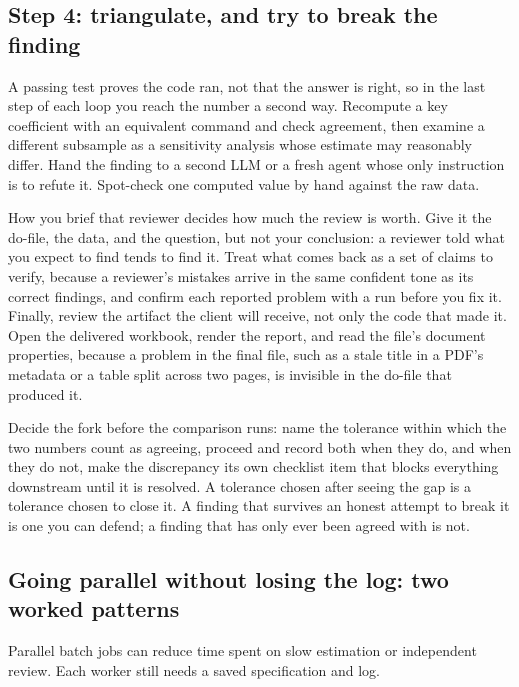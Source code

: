 \subsection{Step 4: triangulate, and try to break the finding}
A passing test proves the code ran, not that the answer is right, so in the last step of each loop you reach the number a second way. Recompute a key coefficient with an equivalent command and check agreement, then examine a different subsample as a sensitivity analysis whose estimate may reasonably differ. Hand the finding to a second LLM or a fresh agent whose only instruction is to refute it. Spot-check one computed value by hand against the raw data.

How you brief that reviewer decides how much the review is worth. Give it the do-file, the data, and the question, but not your conclusion: a reviewer told what you expect to find tends to find it. Treat what comes back as a set of claims to verify, because a reviewer's mistakes arrive in the same confident tone as its correct findings, and confirm each reported problem with a run before you fix it. Finally, review the artifact the client will receive, not only the code that made it. Open the delivered workbook, render the report, and read the file's document properties, because a problem in the final file, such as a stale title in a PDF's metadata or a table split across two pages, is invisible in the do-file that produced it.

Decide the fork before the comparison runs: name the tolerance within which the two numbers count as agreeing, proceed and record both when they do, and when they do not, make the discrepancy its own checklist item that blocks everything downstream until it is resolved. A tolerance chosen after seeing the gap is a tolerance chosen to close it. A finding that survives an honest attempt to break it is one you can defend; a finding that has only ever been agreed with is not.

\subsection{Going parallel without losing the log: two worked patterns}\label{sec:backbone-parallel}
Parallel batch jobs can reduce time spent on slow estimation or independent review. Each worker still needs a saved specification and log.

